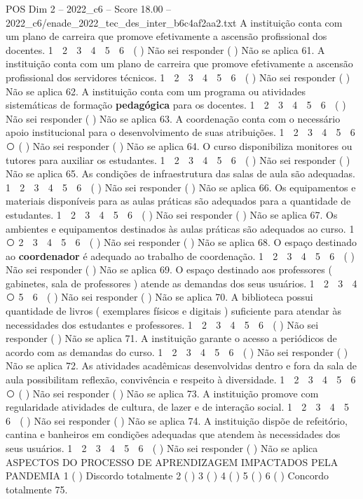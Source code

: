 \begin{textsample}{POS Dim 2 – 2022\_c6 – Score 18.00 – 2022\_c6/enade\_2022\_tec\_des\_inter\_b6c4af2aa2.txt}
A instituição conta com um plano de carreira que promove efetivamente a ascensão profissional dos docentes. 1 ⃝ 2 ⃝ 3 ⃝ 4 ⃝ 5 ⃝ 6 ⃝ ( ) Não sei responder ( ) Não se aplica 61.
A instituição conta com um plano de carreira que promove efetivamente a ascensão profissional dos servidores técnicos. 1 ⃝ 2 ⃝ 3 ⃝ 4 ⃝ 5 ⃝ 6 ⃝ ( ) Não sei responder ( ) Não se aplica 62.
A instituição conta com um programa ou atividades sistemáticas de formação \textbf{pedagógica} para os docentes. 1 ⃝ 2 ⃝ 3 ⃝ 4 ⃝ 5 ⃝ 6 ⃝ ( ) Não sei responder ( ) Não se aplica 63.
A coordenação conta com o necessário apoio institucional para o desenvolvimento de suas atribuições. 1 ⃝ 2 ⃝ 3 ⃝ 4 ⃝ 5 ⃝ 6 ⃝ ( ) Não sei responder ( ) Não se aplica 64.
O curso disponibiliza monitores ou tutores para auxiliar os estudantes. 1 ⃝ 2 ⃝ 3 ⃝ 4 ⃝ 5 ⃝ 6 ⃝ ( ) Não sei responder ( ) Não se aplica 65.
As condições de infraestrutura das salas de aula são adequadas. 1 ⃝ 2 ⃝ 3 ⃝ 4 ⃝ 5 ⃝ 6 ⃝ ( ) Não sei responder ( ) Não se aplica 66.
Os equipamentos e materiais disponíveis para as aulas práticas são adequados para a quantidade de estudantes. 1 ⃝ 2 ⃝ 3 ⃝ 4 ⃝ 5 ⃝ 6 ⃝ ( ) Não sei responder ( ) Não se aplica 67.
Os ambientes e equipamentos destinados às aulas práticas são adequados ao curso. 1 ⃝ 2 ⃝ 3 ⃝ 4 ⃝ 5 ⃝ 6 ⃝ ( ) Não sei responder ( ) Não se aplica 68.
O espaço destinado ao \textbf{coordenador} é adequado ao trabalho de coordenação. 1 ⃝ 2 ⃝ 3 ⃝ 4 ⃝ 5 ⃝ 6 ⃝ ( ) Não sei responder ( ) Não se aplica 69.
O espaço destinado aos professores ( gabinetes, sala de professores ) atende as demandas dos seus usuários. 1 ⃝ 2 ⃝ 3 ⃝ 4 ⃝ 5 ⃝ 6 ⃝ ( ) Não sei responder ( ) Não se aplica 70.
A biblioteca possui quantidade de livros ( exemplares físicos e digitais ) suficiente para atendar às necessidades dos estudantes e professores. 1 ⃝ 2 ⃝ 3 ⃝ 4 ⃝ 5 ⃝ 6 ⃝ ( ) Não sei responder ( ) Não se aplica 71.
A instituição garante o acesso a periódicos de acordo com as demandas do curso. 1 ⃝ 2 ⃝ 3 ⃝ 4 ⃝ 5 ⃝ 6 ⃝ ( ) Não sei responder ( ) Não se aplica 72.
As atividades acadêmicas desenvolvidas dentro e fora da sala de aula possibilitam reflexão, convivência e respeito à diversidade. 1 ⃝ 2 ⃝ 3 ⃝ 4 ⃝ 5 ⃝ 6 ⃝ ( ) Não sei responder ( ) Não se aplica 73.
A instituição promove com regularidade atividades de cultura, de lazer e de interação social. 1 ⃝ 2 ⃝ 3 ⃝ 4 ⃝ 5 ⃝ 6 ⃝ ( ) Não sei responder ( ) Não se aplica 74.
A instituição dispõe de refeitório, cantina e banheiros em condições adequadas que atendem às necessidades dos seus usuários. 1 ⃝ 2 ⃝ 3 ⃝ 4 ⃝ 5 ⃝ 6 ⃝ ( ) Não sei responder ( ) Não se aplica ASPECTOS DO PROCESSO DE APRENDIZAGEM IMPACTADOS PELA PANDEMIA 1 ( ) Discordo totalmente 2 ( ) 3 ( ) 4 ( ) 5 ( ) 6 ( ) Concordo totalmente 75.

\end{textsample}
